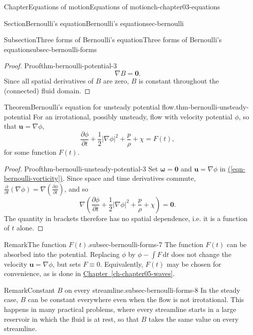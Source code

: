 \documentclass[oneside,10pt,]{book}
\newcommand{\xreffont}{\relax}
\numberwithin{equation}{section}
\newcommand{\de}{\mathrm{d}}
\newcommand{\pd}[2]{\frac{\partial#1}{\partial#2}}
\newcommand{\bu}{\boldsymbol{u}}
\newcommand{\bomega}{\boldsymbol{\omega}}
\begin{document}
\begin{chapterptx}{Chapter}{Equations of motion}{}{Equations of motion}{}{}{ch-chapter03-equations}
\begin{sectionptx}{Section}{Bernoulli's equation}{}{Bernoulli's equation}{}{}{sec-bernoulli}
\begin{subsectionptx}{Subsection}{Three forms of Bernoulli's equation}{}{Three forms of Bernoulli's equation}{}{}{subsec-bernoulli-forms}
\begin{proof}{Proof}{}{thm-bernoulli-potential-3}
\begin{equation*}
\nabla B = \mathbf{0}.
\end{equation*}
Since all spatial derivatives of \(B\) are zero, \(B\) is constant throughout the (connected) fluid domain.%
\end{proof}
\begin{theorem}{Theorem}{Bernoulli's equation for unsteady potential flow.}{}{thm-bernoulli-unsteady-potential}%
For an irrotational, possibly unsteady, flow with velocity potential \(\phi\), so that \(\bu = \nabla\phi\),%
\begin{equation}
\pd{\phi}{t} + \frac{1}{2}|\nabla\phi|^2 + \frac{p}{\rho} + \chi = F(t),\label{eqn-bernoulli-unsteady-potential}
\end{equation}
for some function \(F(t)\).%
\end{theorem}
\begin{proof}{Proof}{}{thm-bernoulli-unsteady-potential-3}
Set \(\bomega = \mathbf{0}\) and \(\bu = \nabla\phi\) in \hyperref[eqn-bernoulli-vorticity]{({\xreffont\ref{eqn-bernoulli-vorticity}})}. Since space and time derivatives commute, \(\pd{}{t}(\nabla
\phi) = \nabla\left(\pd{\phi}{t}\right)\), and so%
\begin{equation*}
\nabla\left( \pd{\phi}{t} + \frac{1}{2}|\nabla\phi|^2 + \frac{p}{\rho} + \chi
\right) = \mathbf{0}.
\end{equation*}
The quantity in brackets therefore has no spatial dependence, i.e. it is a function of \(t\) alone.%
\end{proof}
\begin{remark}{Remark}{The function \(F(t)\).}{subsec-bernoulli-forms-7}%
The function \(F(t)\) can be absorbed into the potential. Replacing \(\phi\) by \(\phi
- \int F \, \de{t}\) does not change the velocity \(\bu = \nabla\phi\), but sets \(F
\equiv 0\). Equivalently, \(F(t)\) may be chosen for convenience, as is done in \hyperref[ch-chapter05-waves]{Chapter~{\xreffont\ref{ch-chapter05-waves}}}.%
\end{remark}
\begin{remark}{Remark}{Constant \(B\) on every streamline.}{subsec-bernoulli-forms-8}%
In the steady case, \(B\) can be constant everywhere even when the flow is not irrotational. This happens in many practical problems, where every streamline starts in a large reservoir in which the fluid is at rest, so that \(B\) takes the same value on every streamline.%
\end{remark}
\end{subsectionptx}
%
%
\typeout{************************************************}

\end{sectionptx}
\end{chapterptx}
\end{document}

